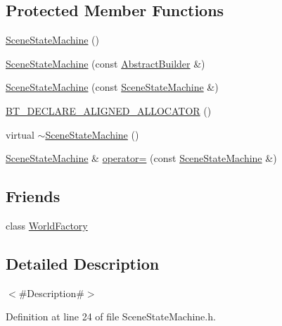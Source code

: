 \subsection*{Protected Member Functions}
\begin{DoxyCompactItemize}
\item 
\mbox{\hyperlink{classnjli_1_1_scene_state_machine_ac83cc2a4660d40ab9edd96b0c84c8582}{Scene\+State\+Machine}} ()
\item 
\mbox{\hyperlink{classnjli_1_1_scene_state_machine_a6b9e73f592b2b21dc20c4ad857200a55}{Scene\+State\+Machine}} (const \mbox{\hyperlink{classnjli_1_1_abstract_builder}{Abstract\+Builder}} \&)
\item 
\mbox{\hyperlink{classnjli_1_1_scene_state_machine_a2aa3ce6ee48ccf355faba089b44aa57c}{Scene\+State\+Machine}} (const \mbox{\hyperlink{classnjli_1_1_scene_state_machine}{Scene\+State\+Machine}} \&)
\item 
\mbox{\hyperlink{classnjli_1_1_scene_state_machine_a8d6f652887b7adf0a6627c60640a42d5}{B\+T\+\_\+\+D\+E\+C\+L\+A\+R\+E\+\_\+\+A\+L\+I\+G\+N\+E\+D\+\_\+\+A\+L\+L\+O\+C\+A\+T\+OR}} ()
\item 
virtual \mbox{\hyperlink{classnjli_1_1_scene_state_machine_adc1399c50341ce5a2b1b0da1347f2fa0}{$\sim$\+Scene\+State\+Machine}} ()
\item 
\mbox{\hyperlink{classnjli_1_1_scene_state_machine}{Scene\+State\+Machine}} \& \mbox{\hyperlink{classnjli_1_1_scene_state_machine_a4b30a311d96f0b26e1fdf6d66fe01512}{operator=}} (const \mbox{\hyperlink{classnjli_1_1_scene_state_machine}{Scene\+State\+Machine}} \&)
\end{DoxyCompactItemize}
\subsection*{Friends}
\begin{DoxyCompactItemize}
\item 
class \mbox{\hyperlink{classnjli_1_1_scene_state_machine_acb96ebb09abe8f2a37a915a842babfac}{World\+Factory}}
\end{DoxyCompactItemize}


\subsection{Detailed Description}
$<$\#\+Description\#$>$ 

Definition at line 24 of file Scene\+State\+Machine.\+h.




